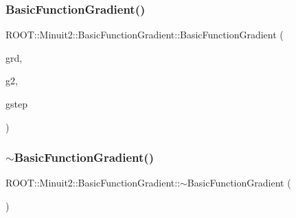 \mbox{\label{classROOT_1_1Minuit2_1_1BasicFunctionGradient_a21eb32598f6a67f9cb45c1f4dac05825}} 
\subsubsection{\texorpdfstring{BasicFunctionGradient()}{BasicFunctionGradient()}\hspace{0.1cm}{\footnotesize\ttfamily [3/8]}}
{\footnotesize\ttfamily R\+O\+O\+T\+::\+Minuit2\+::\+Basic\+Function\+Gradient\+::\+Basic\+Function\+Gradient (\begin{DoxyParamCaption}\item[{const \mbox{\hyperlink{namespaceROOT_1_1Minuit2_a62ed97730a1ca8d3fbaec64a19aa11c9}{Mn\+Algebraic\+Vector}} \&}]{grd,  }\item[{const \mbox{\hyperlink{namespaceROOT_1_1Minuit2_a62ed97730a1ca8d3fbaec64a19aa11c9}{Mn\+Algebraic\+Vector}} \&}]{g2,  }\item[{const \mbox{\hyperlink{namespaceROOT_1_1Minuit2_a62ed97730a1ca8d3fbaec64a19aa11c9}{Mn\+Algebraic\+Vector}} \&}]{gstep }\end{DoxyParamCaption})\hspace{0.3cm}{\ttfamily [inline]}}

\mbox{\label{classROOT_1_1Minuit2_1_1BasicFunctionGradient_a55ce8afeb4e559cf2d2c88aca167b524}} 
\subsubsection{\texorpdfstring{$\sim$BasicFunctionGradient()}{~BasicFunctionGradient()}\hspace{0.1cm}{\footnotesize\ttfamily [1/2]}}
{\footnotesize\ttfamily R\+O\+O\+T\+::\+Minuit2\+::\+Basic\+Function\+Gradient\+::$\sim$\+Basic\+Function\+Gradient (\begin{DoxyParamCaption}{ }\end{DoxyParamCaption})\hspace{0.3cm}{\ttfamily [inline]}}

